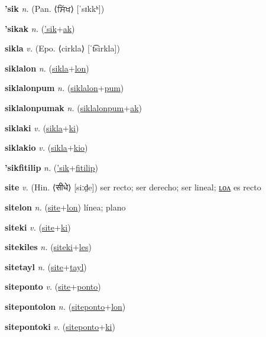 \textbf{\hypertarget{'sik}{'sik}} \textit{n.} (Pan. ⟨{\gurmukhi{}ਸਿੱਖ}⟩ [ˈsɪkkʰ])


\textbf{\hypertarget{'sikak}{'sikak}} \textit{n.} (\hyperlink{'sik}{'sik}+\allowbreak \hyperlink{ak}{ak})


\textbf{\hypertarget{sikla}{sikla}} \textit{v.} (Epo. ⟨cirkla⟩ [ˈt͡sirkla])


\textbf{\hypertarget{siklalon}{siklalon}} \textit{n.} (\hyperlink{sikla}{sikla}+\allowbreak \hyperlink{lon}{lon})


\textbf{\hypertarget{siklalonpum}{siklalonpum}} \textit{n.} (\hyperlink{siklalon}{siklalon}+\allowbreak \hyperlink{pum}{pum})


\textbf{\hypertarget{siklalonpumak}{siklalonpumak}} \textit{n.} (\hyperlink{siklalonpum}{siklalonpum}+\allowbreak \hyperlink{ak}{ak})


\textbf{\hypertarget{siklaki}{siklaki}} \textit{v.} (\hyperlink{sikla}{sikla}+\allowbreak \hyperlink{ki}{ki})


\textbf{\hypertarget{siklakio}{siklakio}} \textit{v.} (\hyperlink{sikla}{sikla}+\allowbreak \hyperlink{kio}{kio})


\textbf{\hypertarget{'sikfitilip}{'sikfitilip}} \textit{n.} (\hyperlink{'sik}{'sik}+\allowbreak \hyperlink{fitilip}{fitilip})


\textbf{\hypertarget{site}{site}} \textit{v.} (Hin. ⟨{\devanagari{}सीधे}⟩ [siːd̤e])
ser recto; ser derecho; ser lineal; \hyperlink{sitelon}{ʟᴏᴧ} es recto

\textbf{\hypertarget{sitelon}{sitelon}} \textit{n.} (\hyperlink{site}{site}+\allowbreak \hyperlink{lon}{lon})
línea; plano

\textbf{\hypertarget{siteki}{siteki}} \textit{v.} (\hyperlink{site}{site}+\allowbreak \hyperlink{ki}{ki})


\textbf{\hypertarget{sitekiles}{sitekiles}} \textit{n.} (\hyperlink{siteki}{siteki}+\allowbreak \hyperlink{les}{les})


\textbf{\hypertarget{sitetayl}{sitetayl}} \textit{n.} (\hyperlink{site}{site}+\allowbreak \hyperlink{tayl}{tayl})


\textbf{\hypertarget{siteponto}{siteponto}} \textit{v.} (\hyperlink{site}{site}+\allowbreak \hyperlink{ponto}{ponto})


\textbf{\hypertarget{sitepontolon}{sitepontolon}} \textit{n.} (\hyperlink{siteponto}{siteponto}+\allowbreak \hyperlink{lon}{lon})


\textbf{\hypertarget{sitepontoki}{sitepontoki}} \textit{v.} (\hyperlink{siteponto}{siteponto}+\allowbreak \hyperlink{ki}{ki})


